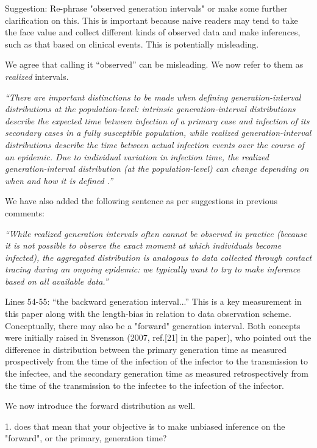 \documentclass[12pt]{article}
\newcommand{\revtext}{\textsf}
\newcommand{\newtext}[1]{\textsl{``#1''}}
\begin{document}
\revtext{
Suggestion: Re-phrase "observed generation intervals" or make some further
clarification on this. This is important because naive readers may tend
to take the face value and collect different kinds of observed data and
make inferences, such as that based on clinical events. This is potentially
misleading.
}

We agree that calling it ``observed'' can be misleading. We now refer to them as \emph{realized} intervals.

\newtext{There are important distinctions to be made when defining generation-interval \emph{distributions} at the population-level: \emph{intrinsic} generation-interval distributions describe the expected time between infection of a primary case and infection of its secondary cases in a fully susceptible population,
while \emph{realized} generation-interval distributions describe the time between actual infection events over the course of an epidemic.
Due to individual variation in infection time, the realized generation-interval distribution (at the population-level) can change depending on when and how it is defined \citep{svensson2007note, kenah2008generation, nishiura2010time, champredon2015intrinsic}.}

We have also added the following sentence as per suggestions in previous comments:

\newtext{While realized generation intervals often cannot be observed in practice (because it is not possible to observe the exact moment at which individuals become infected), the aggregated distribution is analogous to data collected through contact tracing during an ongoing epidemic:
we typically want to try to make inference based on all available data.}

\revtext{Lines 54-55: ``the backward generation interval...'' This is a key measurement in this paper along with the length-bias in relation to data observation scheme. Conceptually, there may also be a "forward" generation
interval. Both concepts were initially raised in Svensson (2007, ref.[21]
in the paper), who pointed out the difference in distribution between the
primary generation time as measured prospectively from the time of the
infection of the infector to the transmission to the infectee, and the secondary generation time as measured retrospectively from the time of the
transmission to the infectee to the infection of the infector.}

We now introduce the forward distribution as well.

\revtext{1. does that mean that your objective is to make unbiased inference on the
"forward", or the primary, generation time?}
\end{document}
